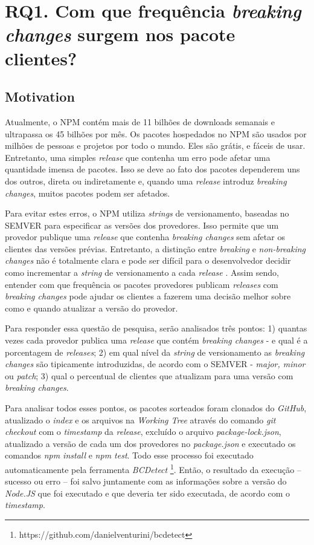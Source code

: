 \section{RQ1. Com que frequência \textit{breaking changes} surgem nos pacote clientes?}
\label{sec:rq1}

\subsection{Motivation}
\label{mot:rq1}

Atualmente, o \Gls{NPM} contém mais de 11 bilhões de downloads semanais e ultrapassa os 45 bilhões por mês. Os pacotes hospedados no \Gls{NPM} são usados por milhões de pessoas e projetos por todo o mundo. Eles são grátis, e fáceis de usar. Entretanto, uma simples \textit{release} que contenha um erro pode afetar uma quantidade imensa de pacotes. Isso se deve ao fato dos pacotes dependerem uns dos outros, direta ou indiretamente e, quando uma \textit{release} introduz \textit{breaking changes}, muitos pacotes podem ser afetados.

Para evitar estes erros, o \Gls{NPM} utiliza \textit{strings} de versionamento, baseadas no \Gls{SEMVER} para especificar as versões dos provedores. Isso permite que um provedor publique uma \textit{release} que contenha \textit{breaking changes} sem afetar os clientes das versões prévias. Entretanto, a distinção entre \textit{breaking} e \textit{non-breaking changes} não é totalmente clara e pode ser difícil para o desenvolvedor decidir como incrementar a \textit{string} de versionamento a cada \textit{release} \cite{noregrets2018}. Assim sendo, entender com que frequência os pacotes provedores publicam \textit{releases} com \textit{breaking changes} pode ajudar os clientes a fazerem uma decisão melhor sobre como e quando atualizar a versão do provedor.

Para responder essa questão de pesquisa, serão analisados três pontos: 1) quantas vezes cada provedor publica uma \textit{release} que contém \textit{breaking changes} - e qual é a porcentagem de \textit{releases}; 2) em qual nível da \textit{string} de versionamento as \textit{breaking changes} são tipicamente introduzidas, de acordo com o \Gls{SEMVER} - \textit{major, minor} ou \textit{patch}; 3) qual o percentual de clientes que atualizam para uma versão com \textit{breaking changes}.

Para analisar todos esses pontos, os pacotes sorteados foram clonados do \textit{GitHub}, atualizado o \textit{index} e os arquivos na \textit{Working Tree} através do comando \textit{git checkout} com o \textit{timestamp} da \textit{release}, excluído o arquivo \textit{package-lock.json}, atualizado a versão de cada um dos provedores no \textit{package.json} e executado os comandos \textit{npm install} e \textit{npm test}. Todo esse processo foi executado automaticamente pela ferramenta \textit{BCDetect} \footnote{https://github.com/danielventurini/bcdetect}. Então, o resultado da execução -- sucesso ou erro -- foi salvo juntamente com as informações sobre a versão do \textit{Node.JS} que foi executado e que deveria ter sido executada, de acordo com o \textit{timestamp}. %

